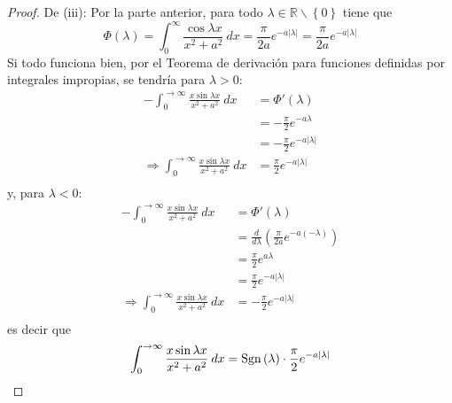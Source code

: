 \documentclass[12pt]{report}
\newcounter{it}
\theoremstyle{largebreak}
\newcommand\abs[1]{\ensuremath{\left|#1\right|}}
\newcommand{\Sgn}[1]{\ensuremath{\textup{Sgn}\left(#1\right)}}
\begin{document}
\begin{proof}
        De (iii): Por la parte anterior, para todo $\lambda\in\mathbb{R}\backslash\left\{0\right\}$ tiene que 
        \begin{equation*}
            \Phi(\lambda)=\int_{0}^{\infty}\frac{\cos\lambda x}{x^2+a^2}\:dx=\frac{\pi}{2a}e^{ -a\abs{\lambda}}=\frac{\pi}{2a}e^{-a\abs{\lambda}}
        \end{equation*}
        Si todo funciona bien, por el Teorema de derivación para funciones definidas por integrales impropias, se tendría para $\lambda>0$:
        \begin{equation*}
            \begin{split}
                -\int_0^{\rightarrow\infty}\frac{x\sin\lambda x}{x^2+a^2}\:dx&=\Phi'(\lambda)\\
                &=-\frac{\pi}{2}e^{-a\lambda}\\
                &=-\frac{\pi}{2}e^{-a\abs{\lambda}}\\
                \Rightarrow \int_0^{\rightarrow\infty}\frac{x\sin\lambda x}{x^2+a^2}\:dx&=\frac{\pi}{2}e^{-a\abs{\lambda}}\\
            \end{split}
        \end{equation*}
        y, para $\lambda<0$:
        \begin{equation*}
            \begin{split}
                -\int_0^{\rightarrow\infty}\frac{x\sin\lambda x}{x^2+a^2}\:dx&=\Phi'(\lambda)\\
                &=\frac{d}{d\lambda}\left(\frac{\pi}{2a}e^{-a(-\lambda)}\right) \\
                &=\frac{\pi}{2}e^{a\lambda}\\
                &=\frac{\pi}{2}e^{-a\abs{\lambda}}\\
                \Rightarrow \int_0^{\rightarrow\infty}\frac{x\sin\lambda x}{x^2+a^2}\:dx&=-\frac{\pi}{2}e^{-a\abs{\lambda}}\\
            \end{split}
        \end{equation*}
        es decir que
        \begin{equation*}
            \int_0^{\rightarrow\infty}\frac{x\sin\lambda x}{x^2+a^2}\:dx=\Sgn{\lambda}\cdot\frac{\pi}{2}e^{ -a\abs{\lambda}}
        \end{equation*}
    \end{proof}
\end{document}
